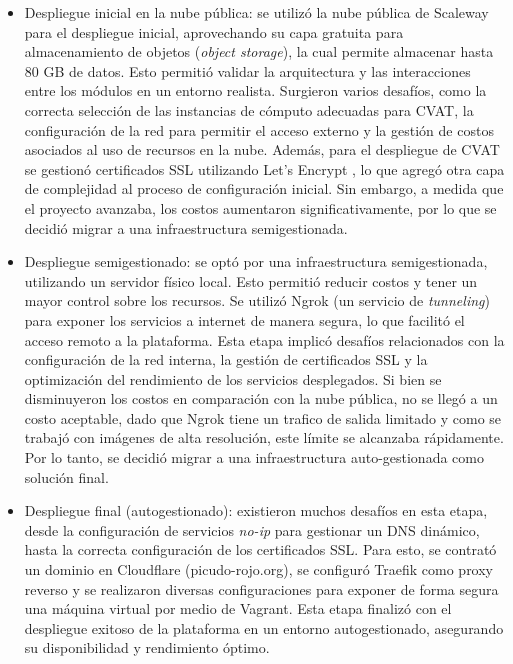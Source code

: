 \begin{itemize}
  \item Despliegue inicial en la nube pública: se utilizó la nube pública de Scaleway para el despliegue inicial, aprovechando su capa gratuita para almacenamiento de objetos (\textit{object storage}), la cual permite almacenar hasta 80 GB de datos. Esto permitió validar la arquitectura y las interacciones entre los módulos en un entorno realista. Surgieron varios desafíos, como la correcta selección de las instancias de cómputo adecuadas para CVAT, la configuración de la red para permitir el acceso externo y la gestión de costos asociados al uso de recursos en la nube. Además, para el despliegue de CVAT se gestionó certificados SSL utilizando Let's Encrypt \citep{aas_lets_2019}, lo que agregó otra capa de complejidad al proceso de configuración inicial. Sin embargo, a medida que el proyecto avanzaba, los costos aumentaron significativamente, por lo que se decidió migrar a una infraestructura semigestionada.
  \item Despliegue semigestionado: se optó por una infraestructura semigestionada, utilizando un servidor físico local. Esto permitió reducir costos y tener un mayor control sobre los recursos. Se utilizó Ngrok \citep{ngrok_inc_ngrok_nodate} (un servicio de \textit{tunneling}) para exponer los servicios a internet de manera segura, lo que facilitó el acceso remoto a la plataforma. Esta etapa implicó desafíos relacionados con la configuración de la red interna, la gestión de certificados SSL y la optimización del rendimiento de los servicios desplegados. Si bien se disminuyeron los costos en comparación con la nube pública, no se llegó a un costo aceptable, dado que Ngrok tiene un trafico de salida limitado y como se trabajó con imágenes de alta resolución, este límite se alcanzaba rápidamente. Por lo tanto, se decidió migrar a una infraestructura auto-gestionada como solución final.
  \item Despliegue final (autogestionado): existieron muchos desafíos en esta etapa, desde la configuración de servicios \textit{no-ip} para gestionar un DNS dinámico, hasta la correcta configuración de los certificados SSL. Para esto, se contrató un dominio en Cloudflare  \citep{cloudflare_conecta_nodate} (picudo-rojo.org), se configuró Traefik \citep{traefik_labs_traefik_nodate} como proxy reverso y se realizaron diversas configuraciones para exponer de forma segura una máquina virtual por medio de Vagrant. Esta etapa finalizó con el despliegue exitoso de la plataforma en un entorno autogestionado, asegurando su disponibilidad y rendimiento óptimo.
\end{itemize}

